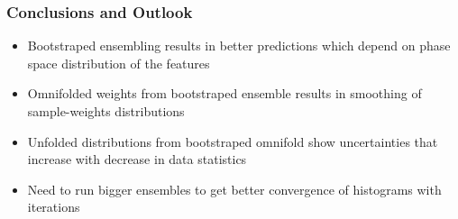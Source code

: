 \documentclass[10pt, aspectratio = 169]{beamer}
\begin{document}
	\begin{frame}
		\frametitle{Conclusions and Outlook}
		\begin{itemize}
			\item Bootstraped ensembling results in better predictions which depend on phase space distribution of the features
			\item Omnifolded weights from bootstraped ensemble results in smoothing of sample-weights distributions
			\item  Unfolded distributions from bootstraped omnifold show uncertainties that increase with decrease in data statistics
			\item Need to run bigger ensembles to get better convergence of histograms with iterations
		\end{itemize}
	\end{frame}
\end{document}
